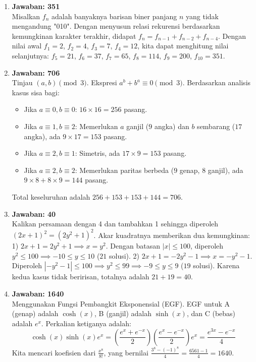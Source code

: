 \documentclass[12pt]{scrartcl}
\begin{document}
\begin{enumerate}
\item \textbf{Jawaban: 351} \\
Misalkan $f_n$ adalah banyaknya barisan biner panjang $n$ yang tidak mengandung "010". Dengan menyusun relasi rekurensi berdasarkan kemungkinan karakter terakhir, didapat $f_n = f_{n-1} + f_{n-2} + f_{n-4}$. 
Dengan nilai awal $f_1 = 2$, $f_2 = 4$, $f_3 = 7$, $f_4 = 12$, kita dapat menghitung nilai selanjutnya: $f_5 = 21$, $f_6 = 37$, $f_7 = 65$, $f_8 = 114$, $f_9 = 200$, $f_{10} = 351$.

\item \textbf{Jawaban: 706} \\
Tinjau $(a,b) \pmod 3$. Ekspresi $a^b + b^a \equiv 0 \pmod 3$. Berdasarkan analisis kasus sisa bagi:
\begin{itemize}
    \item Jika $a \equiv 0, b \equiv 0$: $16 \times 16 = 256$ pasang.
    \item Jika $a \equiv 1, b \equiv 2$: Memerlukan $a$ ganjil ($9$ angka) dan $b$ sembarang ($17$ angka), ada $9 \times 17 = 153$ pasang.
    \item Jika $a \equiv 2, b \equiv 1$: Simetris, ada $17 \times 9 = 153$ pasang.
    \item Jika $a \equiv 2, b \equiv 2$: Memerlukan paritas berbeda ($9$ genap, $8$ ganjil), ada $9 \times 8 + 8 \times 9 = 144$ pasang.
\end{itemize}
Total keseluruhan adalah $256 + 153 + 153 + 144 = 706$.

\item \textbf{Jawaban: 40} \\
Kalikan persamaan dengan 4 dan tambahkan 1 sehingga diperoleh $(2x+1)^2 = (2y^2+1)^2$. Akar kuadratnya memberikan dua kemungkinan:
1) $2x+1 = 2y^2+1 \implies x = y^2$. Dengan batasan $|x| \le 100$, diperoleh $y^2 \le 100 \implies -10 \le y \le 10$ ($21$ solusi).
2) $2x+1 = -2y^2-1 \implies x = -y^2-1$. Diperoleh $|-y^2-1| \le 100 \implies y^2 \le 99 \implies -9 \le y \le 9$ ($19$ solusi).
Karena kedua kasus tidak beririsan, totalnya adalah $21 + 19 = 40$.

\item \textbf{Jawaban: 1640} \\
Menggunakan Fungsi Pembangkit Eksponensial (EGF). EGF untuk A (genap) adalah $\cosh(x)$, B (ganjil) adalah $\sinh(x)$, dan C (bebas) adalah $e^x$. Perkalian ketiganya adalah:
$$ \cosh(x) \sinh(x) e^x = \left(\frac{e^x + e^{-x}}{2}\right) \left(\frac{e^x - e^{-x}}{2}\right) e^x = \frac{e^{3x} - e^{-x}}{4} $$
Kita mencari koefisien dari $\frac{x^8}{8!}$, yang bernilai $\frac{3^8 - (-1)^8}{4} = \frac{6561 - 1}{4} = 1640$.


\end{enumerate}
\end{document}
